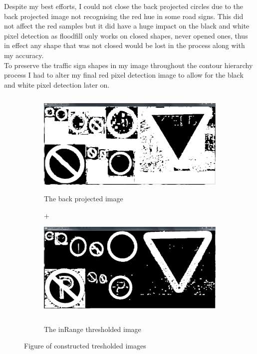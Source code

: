 \documentclass{article}
\begin{document}
Despite my best efforts, I could not close the back projected circles due to the back projected image not recognising the red hue in some road signs. This did not affect the red samples but it did have a huge impact on the black and white pixel detection as floodfill only works on closed shapes, never opened ones, thus in effect any shape that was not closed would be lost in the process along with my accuracy.\\


To preserve the traffic sign shapes in my image throughout the contour hierarchy process I had to alter my final red pixel detection image to allow for the black and white pixel detection later on.\\
\begin{figure}[H]
\begin{subfigure}{0.5\textwidth}
\includegraphics[width=0.9\linewidth, height=5cm]{N_DIL_THRESH_BKPROJ.PNG} 
\caption{The back projected image}
\label{fig:subim1}
\end{subfigure}
\begin{subfigure}{0.5\textwidth}
$+   $
\includegraphics[width=0.9\linewidth, height=5cm]{N_MORPH_DIL_INRNG.PNG}
\caption{The inRange thresholded image}
\label{fig:subim2}
\end{subfigure}
\caption{Figure of constructed tresholded images}
\label{fig:image2}
\end{figure}
\end{document}
